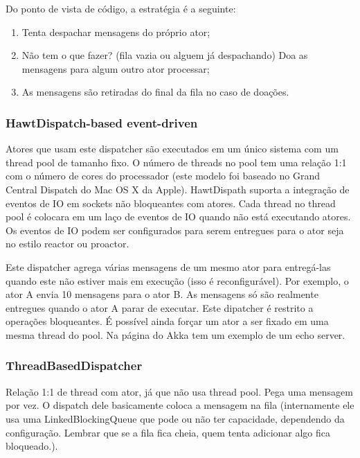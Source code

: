 \documentclass[]{article}
\begin{document}
			Do ponto de vista de código, a estratégia é a seguinte: 
			\begin{enumerate}
				\item Tenta despachar mensagens do próprio ator;
				\item Não tem o que fazer? (fila vazia ou alguem já despachando) Doa as mensagens para algum outro ator processar;
				\item As mensagens são retiradas do final da fila no caso de doações.
			\end{enumerate}
			
			\subsubsection{HawtDispatch-based event-driven}
			Atores que usam este dispatcher são executados em um único sistema com um thread pool de tamanho fixo. O número
			de threads no pool tem uma relação 1:1 com o número de cores do processador (este modelo foi baseado no Grand Central 
			Dispatch do Mac OS X da Apple). 
			HawtDispath suporta a integração de eventos de IO em sockets não bloqueantes com atores. Cada thread no thread pool
			é colocara em um laço de eventos de IO quando não está executando atores. Os eventos de IO podem ser configurados para
			serem entregues para o ator seja no estilo reactor ou proactor.
			
			Este dispatcher agrega várias mensagens de um mesmo ator para entregá-las quando
			este não estiver mais em execução (isso é reconfigurável). Por exemplo, o ator A envia 10 mensagens para o ator B. 
			As mensagens só são realmente entregues quando o ator A parar de executar. Este dipatcher é restrito a operações
			bloqueantes. É possível ainda forçar um ator a ser fixado em uma mesma thread do pool. Na página do Akka tem um exemplo
			de um echo server.
			
			\subsubsection{ThreadBasedDispatcher}
			Relação 1:1 de thread com ator, já que não usa thread pool. Pega uma mensagem por vez. O dispatch dele basicamente
			coloca a mensagem na fila (internamente ele usa uma LinkedBlockingQueue que pode ou não ter capacidade, dependendo
			da configuração. Lembrar que se a fila fica cheia, quem tenta adicionar algo fica bloqueado.).
			
\end{document}
